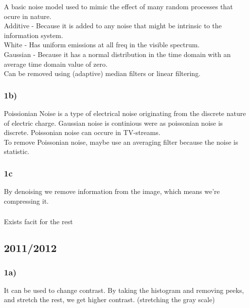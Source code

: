 \documentclass[12pt]{article}
\begin{document}
        A basic noise model used to mimic the effect of many random processes that ocure in nature. \\
        Additive - Because it is added to any noise that might be intrinsic to the information system.\\
        White - Has uniform emissions at all freq in the visible spectrum.\\
        Gaussian - Because it has a normal distribution in the time domain with an average time domain value of zero.\\
        Can be removed using (adaptive) median filters or linear filtering.
        
    \subsubsection*{1b)}
    
        Poissionian Noise is a type of electrical noise originating from the discrete nature of electric charge. 
        Gaussian noise is continious were as poissonian noise is discrete. Poissonian noise can occure in TV-streams. \\
        To remove Poissonian noise, maybe use an averaging filter because the noise is statistic.
        
    \subsubsection*{1c}
    
        By denoising we remove information from the image, which means we're compressing it.
        
    \subsubsection*{}
        
        Exists facit for the rest
        
\subsection{2011/2012}

    \subsubsection*{1a)}
    
        It can be used to change contrast. By taking the histogram and removing peeks, and stretch the rest, we get higher contrast.
        (stretching the gray scale)
    
\end{document}
